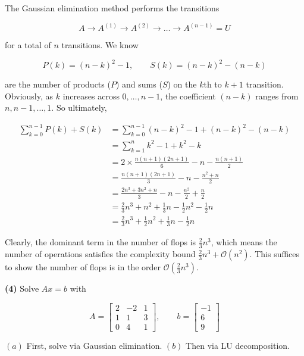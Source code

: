 \documentclass[12pt]{article}
\theoremstyle{definition}
\begin{document}
The Gaussian elimination method performs the transitions 

\begin{equation*}
    A \to A^{(1)} \to A^{(2)} \to  \ldots \to A^{(n-1)} = U
\end{equation*}

for a total of $n$ transitions. We know

\begin{equation*}
    P(k) = (n-k)^2 - 1, \qquad S(k) = (n-k)^2 - (n-k)
\end{equation*}

are the number of products ($P$) and sums ($S$) on the $k$th to $k+1$
transition. Obviously, as $k$ increases across $0, \ldots, n-1$,
the coefficient $(n-k)$ ranges from $n, n-1, \ldots, 1$. So ultimately, 

\begin{align*}
    \sum_{k=0}^{n-1} P(k) + S(k)
    &=\sum_{k=0}^{n-1} (n-k)^2 - 1 + (n-k)^2 - (n-k) \\ 
    &= \sum_{k=1}^n  k^2 - 1 + k^2 - k \\ 
    &= 2\times\frac{n(n+1)(2n+1)}{6} - n - \frac{n(n+1)}{2} \\ 
    &= \frac{n(n+1)(2n+1)}{3} - n - \frac{n^2 + n}{2}\\
    &=\frac{2n^3 + 3n^2 + n }{3} - n -\frac{n^2}{2} + \frac{n}{2} \\ 
    &= \frac{2}{3}n^3 + n^2 + \frac{1}{3}n - \frac{1}{2}n^2 - \frac{1}{2}n  \\ 
    &= \frac{2}{3}n^3 +\frac{1}{2} n^2 + \frac{1}{3}n - \frac{1}{2}n 
\end{align*}

Clearly, the dominant term in the number of flops is $\frac{2}{3}n^3$, which
means the number of operations satisfies the complexity bound $\frac{2}{3}n^3 +
\mathcal{O}(n^2)$. This suffices to show the number of flops is in the order 
$\mathcal{O}\left( \frac{2}{3}n^3 \right) $.

\pagebreak 


\begin{shaded}
    \textbf{(4)} Solve $Ax = b$ with 

    \begin{equation*}
        A = \begin{bmatrix} 
            2 & -2 & 1 \\ 
            1 & 1 & 3 \\ 
            0  & 4 & 1
        \end{bmatrix}, \qquad b = \begin{bmatrix} 
                -1 \\ 6 \\ 9 
        \end{bmatrix} 
    \end{equation*}

    $(a)$ First, solve via Gaussian elimination. $(b)$ Then via LU
    decomposition.
\end{shaded}
\end{document}
